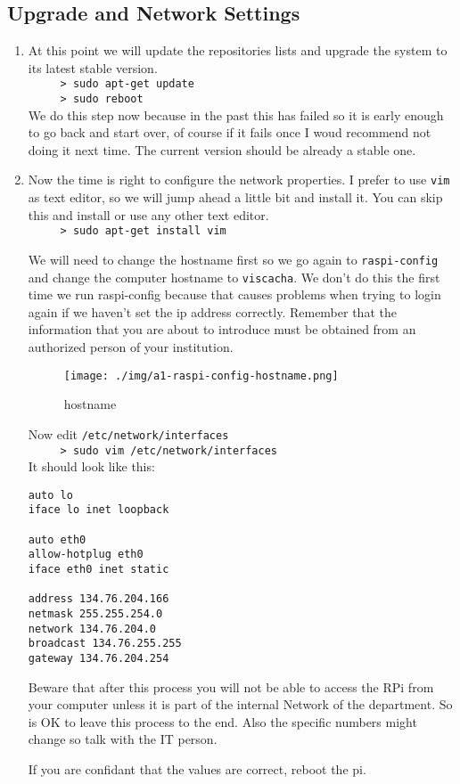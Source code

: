   \subsection{Upgrade and Network Settings}
 \begin{enumerate}

  \item At this point we will update the repositories lists and upgrade the system to its latest stable version.\\
  \verb=     > sudo apt-get update=\\
  \verb=     > sudo reboot=\\
  We do this step now because in the past this has failed so it is early enough to go back and start over, of course if it fails once I woud recommend
  not doing it next time. The current version should be already a stable one.
  \item Now the time is right to configure the network properties. I prefer to use \verb=vim= as text editor, so we will jump ahead a little bit 
  and install it. You can skip this and install or use any other text editor.\\
  \verb=     > sudo apt-get install vim=
  
  We will need to change the hostname first so we go again to \verb=raspi-config= and change the computer hostname to \verb=viscacha=.
  We don't do this the first time we run raspi-config because that causes problems when trying to login again if we haven't set the ip 
  address correctly. Remember that the information that you are about to introduce must be obtained from an authorized person of your institution.
  
  \begin{figure}[h!]
 \centering
 \texttt{[image: ./img/a1-raspi-config-hostname.png]}
 \caption{hostname}
 \label{fig:a1-hostname}
\end{figure}

  
  Now edit \verb=/etc/network/interfaces=\\
  \verb=     > sudo vim /etc/network/interfaces=\\
  It should look like this:\\
  \begin{verbatim}
auto lo
iface lo inet loopback

auto eth0
allow-hotplug eth0
iface eth0 inet static

address 134.76.204.166
netmask 255.255.254.0
network 134.76.204.0
broadcast 134.76.255.255
gateway 134.76.204.254
  \end{verbatim}
  
  Beware that after this process you will not be able to access the RPi from your computer unless it is part of the internal Network of the 
  department. So is OK to leave this process to the end. Also the specific numbers might change so talk with the IT person.
  
  If you are confidant that the values are correct, reboot the pi.
\end{enumerate}

